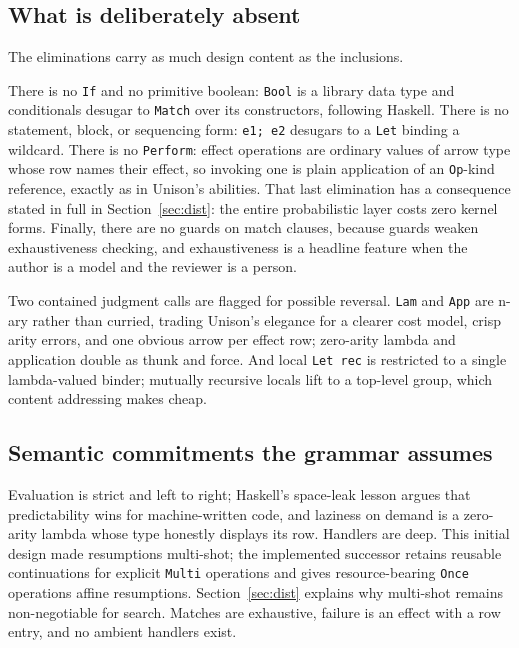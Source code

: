 \documentclass[11pt]{article}
\begin{document}
\subsection{What is deliberately absent}

The eliminations carry as much design content as the inclusions.

There is no \texttt{If} and no primitive boolean: \texttt{Bool} is a library data type and conditionals desugar to \texttt{Match} over its constructors, following Haskell. There is no statement, block, or sequencing form: \texttt{e1; e2} desugars to a \texttt{Let} binding a wildcard. There is no \texttt{Perform}: effect operations are ordinary values of arrow type whose row names their effect, so invoking one is plain application of an \texttt{Op}-kind reference, exactly as in Unison's abilities. That last elimination has a consequence stated in full in Section~\ref{sec:dist}: the entire probabilistic layer costs zero kernel forms. Finally, there are no guards on match clauses, because guards weaken exhaustiveness checking, and exhaustiveness is a headline feature when the author is a model and the reviewer is a person.

Two contained judgment calls are flagged for possible reversal. \texttt{Lam} and \texttt{App} are n-ary rather than curried, trading Unison's elegance for a clearer cost model, crisp arity errors, and one obvious arrow per effect row; zero-arity lambda and application double as thunk and force. And local \texttt{Let rec} is restricted to a single lambda-valued binder; mutually recursive locals lift to a top-level group, which content addressing makes cheap.

\subsection{Semantic commitments the grammar assumes}

Evaluation is strict and left to right; Haskell's space-leak lesson argues that predictability wins for machine-written code, and laziness on demand is a zero-arity lambda whose type honestly displays its row. Handlers are deep. This initial design made resumptions multi-shot; the implemented successor retains reusable continuations for explicit \texttt{Multi} operations and gives resource-bearing \texttt{Once} operations affine resumptions. Section~\ref{sec:dist} explains why multi-shot remains non-negotiable for search. Matches are exhaustive, failure is an effect with a row entry, and no ambient handlers exist.
\end{document}
